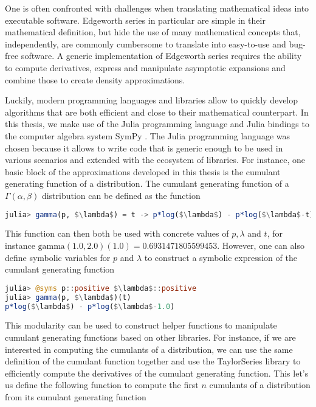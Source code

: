 
One is often confronted with challenges when translating mathematical ideas into executable software. Edgeworth series in particular are simple in their mathematical definition, but hide the use of many mathematical concepts that, independently, are commonly cumbersome to translate into easy-to-use and bug-free software. A generic implementation of Edgeworth series requires the ability to compute derivatives, express and manipulate asymptotic expansions and combine those to create density approximations.

Luckily, modern programming languages and libraries allow to quickly develop algorithms that are both efficient and close to their mathematical counterpart. In this thesis, we make use of the Julia programming language \cite{bezanson2017julia} and Julia bindings to the computer algebra system SymPy \cite{sympy}. The Julia programming language was chosen because it allows to write code that is generic enough to be used in various scenarios and extended with the ecosystem of libraries. For instance, one basic block of the approximations developed in this thesis is the cumulant generating function of a distribution. The cumulant generating function of a $\Gamma(\alpha, \beta)$ distribution can be defined as the function
\begin{lstlisting}[language=Julia, mathescape, escapechar=\%]
julia> gamma(p, $\lambda$) = t -> p*log($\lambda$) - p*log($\lambda$-t)
\end{lstlisting}
This function can then both be used with concrete values of $p, \lambda$ and $t$, for instance $\textrm{gamma}(1.0, 2.0)(1.0) = 0.6931471805599453$. However, one can also define symbolic variables for $p$ and $\lambda$ to construct a symbolic expression of the cumulant generating function
\begin{lstlisting}[language=Julia, mathescape, escapechar=\%]
julia> @syms p::positive $\lambda$::positive
julia> gamma(p, $\lambda$)(t)
p*log($\lambda$) - p*log($\lambda$-1.0)
\end{lstlisting}
This modularity can be used to construct helper functions to manipulate cumulant generating functions based on other libraries. For instance, if we are interested in computing the cumulants of a distribution, we can use the same definition of the cumulant function together and use the TaylorSeries \cite{TaylorSeries} library to efficiently compute the derivatives of the cumulant generating function. This let's us define the following function to compute the first $n$ cumulants of a distribution from its cumulant generating function
